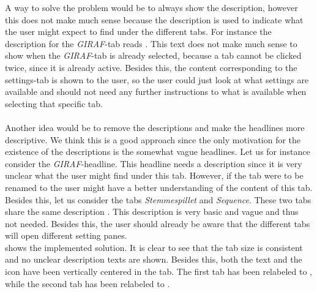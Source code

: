 A way to solve the problem would be to always show the description, however this does not make much sense because the description is used to indicate what the user might expect to find under the different tabs. For instance the description for the \emph{GIRAF}-tab reads . This text does not make much sense to show when the \emph{GIRAF}-tab is already selected, because a tab cannot be clicked twice, since it is already active. Besides this, the content corresponding to the settings-tab is shown to the user, so the user could just look at what settings are available and should not need any further instructions to what is available when selecting that specific tab.
\\\\
Another idea would be to remove the descriptions and make the headlines more descriptive. We think this is a good approach since the only motivation for the existence of the descriptions is the somewhat vague headlines. Let us for instance consider the \emph{GIRAF}-headline. This headline needs a description since it is very unclear what the user might find under this tab. However, if the tab were to be renamed to  the user might have a better understanding of the content of this tab. Besides this, let us consider the tabs \emph{Stemmespillet} and \emph{Sequence}. These two tabs share the same description . This description is very basic and vague and thus not needed. Besides this, the user should already be aware that the different tabs will open different setting panes. \\

 shows the implemented solution. It is clear to see that the tab size is consistent and no unclear description texts are shown. Besides this, both the text and the icon have been vertically centered in the tab. The first tab has been relabeled to , while the second tab has been relabeled to .

